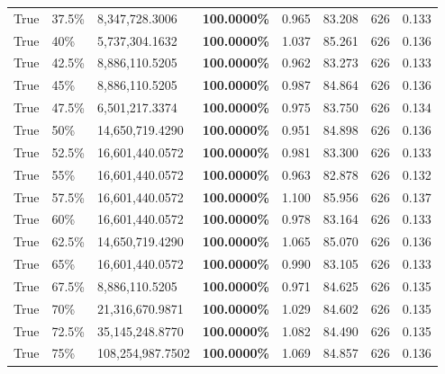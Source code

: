 \begin{table}[H]
\begin{tabular}{lllrllll}
\cline{1-8} \cline{2-8}
True & 37.5\% & 8,347,728.3006 & \bfseries \color{red} 100.0000\% & 0.965 & 83.208 & 626 & 0.133 \\
\cline{1-8} \cline{2-8}
True & 40\% & 5,737,304.1632 & \bfseries \color{red} 100.0000\% & 1.037 & 85.261 & 626 & 0.136 \\
\cline{1-8} \cline{2-8}
True & 42.5\% & 8,886,110.5205 & \bfseries \color{red} 100.0000\% & 0.962 & 83.273 & 626 & 0.133 \\
\cline{1-8} \cline{2-8}
True & 45\% & 8,886,110.5205 & \bfseries \color{red} 100.0000\% & 0.987 & 84.864 & 626 & 0.136 \\
\cline{1-8} \cline{2-8}
True & 47.5\% & 6,501,217.3374 & \bfseries \color{red} 100.0000\% & 0.975 & 83.750 & 626 & 0.134 \\
\cline{1-8} \cline{2-8}
True & 50\% & 14,650,719.4290 & \bfseries \color{red} 100.0000\% & 0.951 & 84.898 & 626 & 0.136 \\
\cline{1-8} \cline{2-8}
True & 52.5\% & 16,601,440.0572 & \bfseries \color{red} 100.0000\% & 0.981 & 83.300 & 626 & 0.133 \\
\cline{1-8} \cline{2-8}
True & 55\% & 16,601,440.0572 & \bfseries \color{red} 100.0000\% & 0.963 & 82.878 & 626 & 0.132 \\
\cline{1-8} \cline{2-8}
True & 57.5\% & 16,601,440.0572 & \bfseries \color{red} 100.0000\% & 1.100 & 85.956 & 626 & 0.137 \\
\cline{1-8} \cline{2-8}
True & 60\% & 16,601,440.0572 & \bfseries \color{red} 100.0000\% & 0.978 & 83.164 & 626 & 0.133 \\
\cline{1-8} \cline{2-8}
True & 62.5\% & 14,650,719.4290 & \bfseries \color{red} 100.0000\% & 1.065 & 85.070 & 626 & 0.136 \\
\cline{1-8} \cline{2-8}
True & 65\% & 16,601,440.0572 & \bfseries \color{red} 100.0000\% & 0.990 & 83.105 & 626 & 0.133 \\
\cline{1-8} \cline{2-8}
True & 67.5\% & 8,886,110.5205 & \bfseries \color{red} 100.0000\% & 0.971 & 84.625 & 626 & 0.135 \\
\cline{1-8} \cline{2-8}
True & 70\% & 21,316,670.9871 & \bfseries \color{red} 100.0000\% & 1.029 & 84.602 & 626 & 0.135 \\
\cline{1-8} \cline{2-8}
True & 72.5\% & 35,145,248.8770 & \bfseries \color{red} 100.0000\% & 1.082 & 84.490 & 626 & 0.135 \\
\cline{1-8} \cline{2-8}
True & 75\% & 108,254,987.7502 & \bfseries \color{red} 100.0000\% & 1.069 & 84.857 & 626 & 0.136 \\

\end{tabular}
\end{table}
